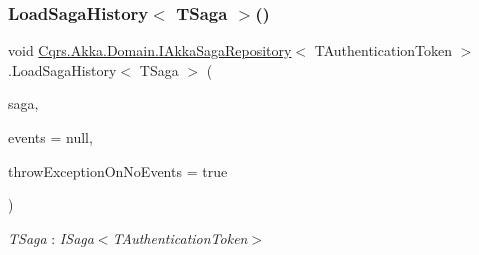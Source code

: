 \subsubsection{\texorpdfstring{Load\+Saga\+History$<$ T\+Saga $>$()}{LoadSagaHistory< TSaga >()}}
{\footnotesize\ttfamily void \hyperlink{interfaceCqrs_1_1Akka_1_1Domain_1_1IAkkaSagaRepository}{Cqrs.\+Akka.\+Domain.\+I\+Akka\+Saga\+Repository}$<$ T\+Authentication\+Token $>$.Load\+Saga\+History$<$ T\+Saga $>$ (\begin{DoxyParamCaption}\item[{T\+Saga}]{saga,  }\item[{I\+List$<$ \hyperlink{interfaceCqrs_1_1Events_1_1ISagaEvent}{I\+Saga\+Event}$<$ T\+Authentication\+Token $>$$>$}]{events = {\ttfamily null},  }\item[{bool}]{throw\+Exception\+On\+No\+Events = {\ttfamily true} }\end{DoxyParamCaption})}

\begin{Desc}
\item[Type Constraints]\begin{description}
\item[{\em T\+Saga} : {\em I\+Saga$<$T\+Authentication\+Token$>$}]\end{description}
\end{Desc}
